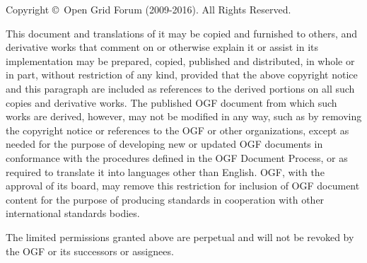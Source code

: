 Copyright \copyright ~Open Grid Forum (2009-2016). All Rights Reserved.

This document and translations of it may be copied and furnished to
others, and derivative works that comment on or otherwise explain it
or assist in its implementation may be prepared, copied, published and 
distributed, in whole or in part, without restriction of any kind,
provided that the above copyright notice and this paragraph are
included as references to the derived portions on all such copies
and derivative works. The published OGF document from which such works
are derived, however, may not be modified in any way, such as by removing
the copyright notice or references to the OGF or other organizations,
except as needed for the purpose of developing new or updated OGF documents
in conformance with the procedures defined in the OGF Document Process,
or as required to translate it into languages other than English. OGF,
with the approval of its board, may remove this restriction for inclusion
of OGF document content for the purpose of producing standards in cooperation
with other international standards bodies. 

The limited permissions granted above are perpetual and will not be
revoked by the OGF or its successors or assignees.
